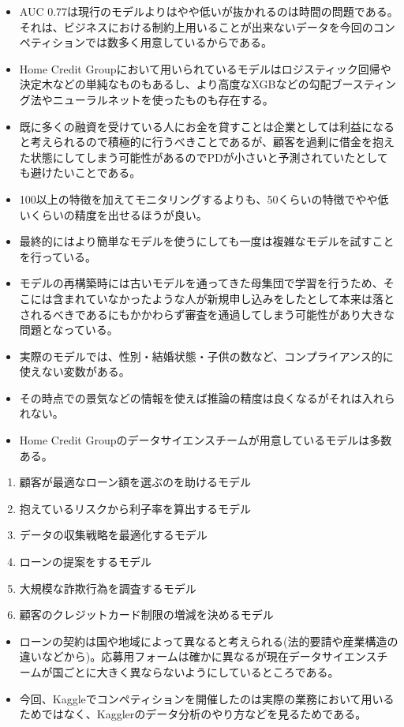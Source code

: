 \documentclass[11pt]{jsarticle}
\providecommand{\tightlist}{%
      \setlength{\itemsep}{0pt}\setlength{\parskip}{0pt}}
\begin{document}
\begin{itemize}
\tightlist
\item
  AUC
  0.77は現行のモデルよりはやや低いが抜かれるのは時間の問題である。それは、ビジネスにおける制約上用いることが出来ないデータを今回のコンペティションでは数多く用意しているからである。
\item
  Home Credit
  Groupにおいて用いられているモデルはロジスティック回帰や決定木などの単純なものもあるし、より高度なXGBなどの勾配ブースティング法やニューラルネットを使ったものも存在する。
\item
  既に多くの融資を受けている人にお金を貸すことは企業としては利益になると考えられるので積極的に行うべきことであるが、顧客を過剰に借金を抱えた状態にしてしまう可能性があるのでPDが小さいと予測されていたとしても避けたいことである。
\item
  100以上の特徴を加えてモニタリングするよりも、50くらいの特徴でやや低いくらいの精度を出せるほうが良い。
\item
  最終的にはより簡単なモデルを使うにしても一度は複雑なモデルを試すことを行っている。
\item
  モデルの再構築時には古いモデルを通ってきた母集団で学習を行うため、そこには含まれていなかったような人が新規申し込みをしたとして本来は落とされるべきであるにもかかわらず審査を通過してしまう可能性があり大きな問題となっている。
\item
  実際のモデルでは、性別・結婚状態・子供の数など、コンプライアンス的に使えない変数がある。
\item
  その時点での景気などの情報を使えば推論の精度は良くなるがそれは入れられない。
\item
  Home Credit
  Groupのデータサイエンスチームが用意しているモデルは多数ある。
\end{itemize}

\begin{enumerate}
\def\labelenumi{\arabic{enumi}.}
\tightlist
\item
  顧客が最適なローン額を選ぶのを助けるモデル
\item
  抱えているリスクから利子率を算出するモデル
\item
  データの収集戦略を最適化するモデル
\item
  ローンの提案をするモデル
\item
  大規模な詐欺行為を調査するモデル
\item
  顧客のクレジットカード制限の増減を決めるモデル
\end{enumerate}

\begin{itemize}
\tightlist
\item
  ローンの契約は国や地域によって異なると考えられる(法的要請や産業構造の違いなどから)。応募用フォームは確かに異なるが現在データサイエンスチームが国ごとに大きく異ならないようにしているところである。
\item
  今回、Kaggleでコンペティションを開催したのは実際の業務において用いるためではなく、Kagglerのデータ分析のやり方などを見るためである。
\end{itemize}
\end{document}
